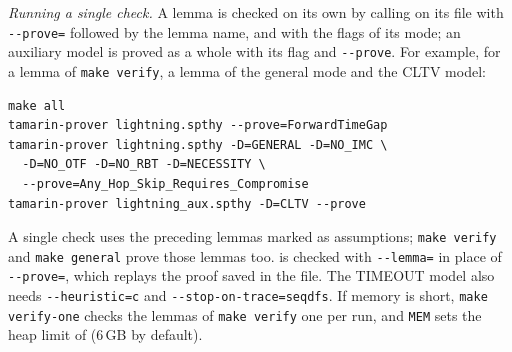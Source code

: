 \emph{Running a single check.} A lemma is checked on its own by calling \tamarin{} on its file
with \texttt{-{}-prove=} followed by the lemma name, and with the flags of its mode; an auxiliary
model is proved as a whole with its flag and \texttt{-{}-prove}. For example, for a lemma of
\texttt{make verify}, a lemma of the general mode and the CLTV model:
{\footnotesize
\begin{verbatim}
make all
tamarin-prover lightning.spthy --prove=ForwardTimeGap
tamarin-prover lightning.spthy -D=GENERAL -D=NO_IMC \
  -D=NO_OTF -D=NO_RBT -D=NECESSITY \
  --prove=Any_Hop_Skip_Requires_Compromise
tamarin-prover lightning_aux.spthy -D=CLTV --prove
\end{verbatim}
}
\noindent A single check uses the preceding lemmas marked \code{[reuse]} as assumptions;
\texttt{make verify} and \texttt{make general} prove those lemmas too.  is checked with \texttt{-{}-lemma=} in place of
\texttt{-{}-prove=}, which replays the proof saved in the file. The TIMEOUT model also needs
\texttt{-{}-heuristic=c} and \texttt{-{}-stop-on-trace=seqdfs}. If memory is short,
\texttt{make verify-one} checks the lemmas of \texttt{make verify} one per run, and \texttt{MEM}
sets the heap limit of \tamarin{} (6\,GB by default).

